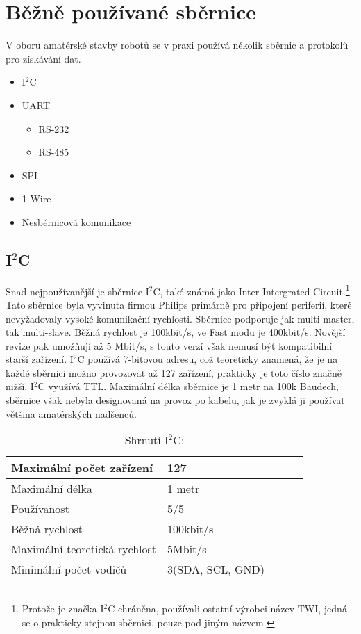 \chapter{Běžně používané sběrnice}
V oboru amatérské stavby robotů se v praxi používá několik sběrnic a protokolů pro získávání dat.
\begin{itemize}
	\item I$^{2}$C
	\item UART
	      \begin{itemize}
		      \item RS-232
		      \item RS-485
	      \end{itemize}
	\item SPI
	\item 1-Wire
	\item Nesběrnicová komunikace
\end{itemize}

\section{I$^{2}$C}
Snad nejpoužívanější je sběrnice I$^{2}$C,
také známá jako Inter-Intergrated Circuit.\footnote{ Protože je značka I$^{2}$C chráněna, používali ostatní výrobci název TWI, jedná se o prakticky stejnou sběrnici, pouze pod jiným názvem.}
Tato sběrnice byla vyvinuta firmou Philips primárně pro připojení periferií, které nevyžadovaly vysoké komunikační rychlosti.
Sběrnice podporuje jak multi-master, tak multi-slave.
Běžná rychlost je 100kbit/s, ve Fast modu je 400kbit/s. Novější revize pak umožňují až 5 Mbit/s, s touto verzí však nemusí být kompatibilní starší zařízení.
I$^{2}$C používá 7-bitovou adresu, což teoreticky znamená, že je na každé sběrnici možno provozovat až 127 zařízení, prakticky je toto číslo značně nižší.
I$^{2}$C využívá TTL.
Maximální délka sběrnice je 1 metr na 100k Baudech, sběrnice však nebyla designovaná na provoz po kabelu, jak je zvyklá ji používat většina amatérských nadšenců.\cite{nxp:UM10204}

\begin{table}[]
	\caption{Shrnutí I$^{2}$C:}
	\centering
	\begin{tabular}{|l|l|l|l|l|} \hline
		Maximální počet zařízení      & 127              \\ \hline
		Maximální délka               & 1 metr           \\ \hline
		Používanost                   & 5/5              \\ \hline
		Běžná rychlost                & 100kbit/s        \\ \hline
		Maximální teoretická rychlost & 5Mbit/s          \\ \hline
		Minimální počet vodičů        & 3(SDA, SCL, GND) \\ \hline
	\end{tabular}
\end{table}



